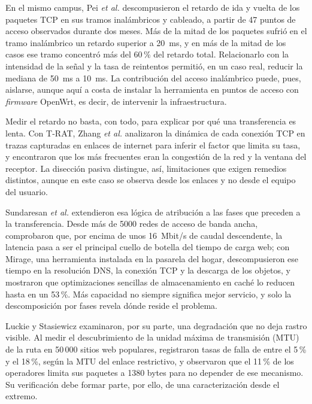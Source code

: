 En el mismo campus, Pei \textit{et al.} \cite{pei2016weakest} descompusieron el retardo de ida y vuelta de los paquetes TCP en sus tramos inalámbricos y cableado, a partir de 47 puntos de acceso observados durante dos meses. Más de la mitad de los paquetes sufrió en el tramo inalámbrico un retardo superior a 20~ms, y en más de la mitad de los casos ese tramo concentró más del 60\,\% del retardo total. Relacionarlo con la intensidad de la señal y la tasa de reintentos permitió, en un caso real, reducir la mediana de 50~ms a 10~ms. La contribución del acceso inalámbrico puede, pues, aislarse, aunque aquí a costa de instalar la herramienta en puntos de acceso con \textit{firmware} OpenWrt, es decir, de intervenir la infraestructura.

Medir el retardo no basta, con todo, para explicar por qué una transferencia es lenta. Con T-RAT, Zhang \textit{et al.} \cite{zhang2002flowrates} analizaron la dinámica de cada conexión TCP en trazas capturadas en enlaces de internet para inferir el factor que limita su tasa, y encontraron que los más frecuentes eran la congestión de la red y la ventana del receptor. La disección pasiva distingue, así, limitaciones que exigen remedios distintos, aunque en este caso se observa desde los enlaces y no desde el equipo del usuario.

Sundaresan \textit{et al.} \cite{sundaresan2013web} extendieron esa lógica de atribución a las fases que preceden a la transferencia. Desde más de 5000 redes de acceso de banda ancha, comprobaron que, por encima de unos 16~Mbit/s de caudal descendente, la latencia pasa a ser el principal cuello de botella del tiempo de carga web; con Mirage, una herramienta instalada en la pasarela del hogar, descompusieron ese tiempo en la resolución DNS, la conexión TCP y la descarga de los objetos, y mostraron que optimizaciones sencillas de almacenamiento en caché lo reducen hasta en un 53\,\%. Más capacidad no siempre significa mejor servicio, y solo la descomposición por fases revela dónde reside el problema.

Luckie y Stasiewicz \cite{luckie2010pmtud} examinaron, por su parte, una degradación que no deja rastro visible. Al medir el descubrimiento de la unidad máxima de transmisión (MTU) de la ruta en 50\,000 sitios web populares, registraron tasas de falla de entre el 5\,\% y el 18\,\%, según la MTU del enlace restrictivo, y observaron que el 11\,\% de los operadores limita sus paquetes a 1380 bytes para no depender de ese mecanismo. Su verificación debe formar parte, por ello, de una caracterización desde el extremo.

